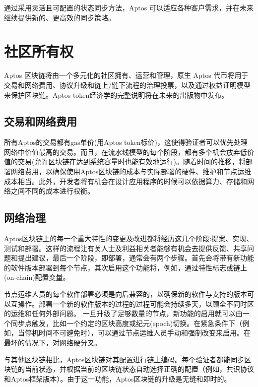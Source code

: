 \documentclass{article}
\begin{document}
通过采用灵活且可配置的状态同步方法，Aptos 可以适应各种客户需求，并在未来继续提供新的、更高效的同步策略。

\section{社区所有权}
\label{sec:community_ownership}

Aptos 区块链将由一个多元化的社区拥有、运营和管理，原生 Aptos 代币将用于交易和网络费用、协议升级和链上/链下流程的治理投票，以及通过权益证明模型来保护区块链。Aptos token经济学的完整说明将在未来的出版物中发布。


\subsection{交易和网络费用}
\label{subsec:network_fees}

所有Aptos的交易都有gas单价(用Aptos token标价)，这使得验证者可以优先处理网络中价值最高的交易。而且，在流水线模型的每个阶段，都有多个机会放弃低价值的交易(允许区块链在达到系统容量时也能有效地运行)。随着时间的推移，将部署网络费用，以确保使用Aptos区块链的成本与实际部署的硬件、维护和节点运维成本相当。此外，开发者将有机会在设计应用程序的时候可以依据算力、存储和网络之间不同的成本进行权衡。


\subsection{网络治理}
\label{subsec:network_governance}

Aptos区块链上的每一个重大特性的变更及改进都将经历这几个阶段:提案、实现、测试和部署。这样的流程让有关人士及利益相关者能够有机会去提供反馈、共享问题和提出建议，最后一个阶段，即部署，通常会有两个步骤。首先会将带有新功能的软件版本部署到每个节点，其次启用这个功能将，例如，通过特性标志或链上(on-chain)配置变量。

节点运维人员的每个软件部署必须是向后兼容的，以确保新的软件与支持的版本可以互操作。部署一个新的软件版本的过程的过程可能会持续多天，以顾全不同时区的运维和任何外部问题。 一旦升级了足够数量的节点，新功能的启用就可以由一个同步点触发，比如一个约定的区块高度或纪元(epoch)切换。在紧急条件下（例如，当停机时间不可避免时），可以通过节点运维人员手动和强制改变来启用。在最坏的情况下，对网络硬分叉。

与其他区块链相比，Aptos区块链对其配置进行链上编码。每个验证者都能同步区块链的当前状态，并根据当前的区块链状态自动选择正确的配置（例如，共识协议和Aptos框架版本）。由于这一功能，Aptos区块链的升级是无缝和即时的。
\end{document}
